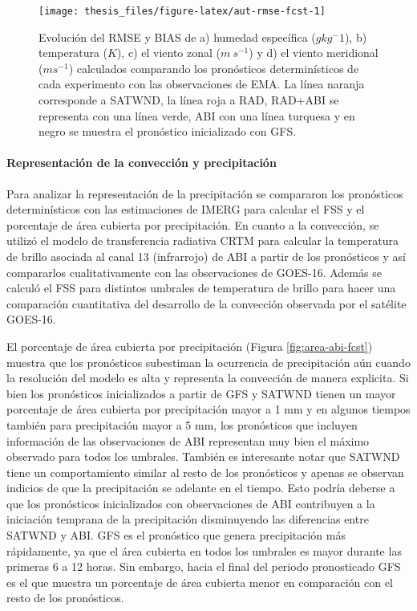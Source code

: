 \documentclass[12pt,oneside,a4paper]{reedthesis}
\begin{document}
\begin{figure}

{\centering \texttt{[image: thesis\_files/figure-latex/aut-rmse-fcst-1]} 

}

\caption{Evolución del RMSE y BIAS de a) humedad específica (\(g kg{^-1}\)), b) temperatura (\(K\)), c) el viento zonal (\(m\ s^{-1}\)) y d) el viento meridional (\(m s^{-1}\)) calculados comparando los pronósticos determinísticos de cada experimento con las observaciones de EMA. La línea naranja corresponde a SATWND, la línea roja a RAD, RAD+ABI se representa con una línea verde, ABI con una línea turquesa y en negro se muestra el pronóstico inicializado con GFS.}\label{fig:aut-rmse-fcst}
\end{figure}
\hypertarget{representaciuxf3n-de-la-convecciuxf3n-y-precipitaciuxf3n}{%
\paragraph{Representación de la convección y precipitación}\label{representaciuxf3n-de-la-convecciuxf3n-y-precipitaciuxf3n}}

Para analizar la representación de la precipitación se compararon los pronósticos determinísticos con las estimaciones de IMERG para calcular el FSS y el porcentaje de área cubierta por precipitación. En cuanto a la convección, se utilizó el modelo de transferencia radiativa CRTM para calcular la temperatura de brillo asociada al canal 13 (infrarrojo) de ABI a partir de los pronósticos y así compararlos cualitativamente con las observaciones de GOES-16. Además se calculó el FSS para distintos umbrales de temperatura de brillo para hacer una comparación cuantitativa del desarrollo de la convección observada por el satélite GOES-16.

El porcentaje de área cubierta por precipitación (Figura \ref{fig:area-abi-fcst}) muestra que los pronósticos subestiman la ocurrencia de precipitación aún cuando la resolución del modelo es alta y representa la convección de manera explicita. Si bien los pronósticos inicializados a partir de GFS y SATWND tienen un mayor porcentaje de área cubierta por precipitación mayor a 1 mm y en algunos tiempos también para precipitación mayor a 5 mm, los pronósticos que incluyen información de las observaciones de ABI representan muy bien el máximo observado para todos los umbrales. También es interesante notar que SATWND tiene un comportamiento similar al resto de los pronósticos y apenas se observan indicios de que la precipitación se adelante en el tiempo. Esto podría deberse a que los pronósticos inicializados con observaciones de ABI contribuyen a la iniciación temprana de la precipitación disminuyendo las diferencias entre SATWND y ABI. GFS es el pronóstico que genera precipitación más rápidamente, ya que el área cubierta en todos los umbrales es mayor durante las primeras 6 a 12 horas. Sin embargo, hacia el final del periodo pronosticado GFS es el que muestra un porcentaje de área cubierta menor en comparación con el resto de los pronósticos.
\end{document}
